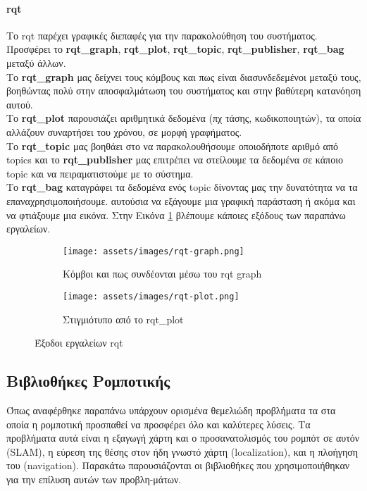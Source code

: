 \paragraph{rqt} 
Το rqt παρέχει γραφικές διεπαφές για την παρακολούθηση του συστήματος. Προσφέρει το \textbf{rqt\_graph}, \textbf{rqt\_plot}, \textbf{rqt\_topic}, \textbf{rqt\_publisher}, \textbf{rqt\_bag} μεταξύ άλλων. \\
Το \textbf{rqt\_graph} μας δείχνει τους κόμβους και πως είναι διασυνδεδεμένοι μεταξύ τους, βοηθώντας πολύ στην αποσφαλμάτωση του συστήματος και στην βαθύτερη κατανόηση αυτού. \\
Το \textbf{rqt\_plot} παρουσιάζει αριθμητικά δεδομένα (πχ τάσης, κωδικοποιητών), τα οποία αλλάζουν συναρτήσει του χρόνου, σε μορφή γραφήματος. \\
Το \textbf{rqt\_topic} μας βοηθάει στο να παρακολουθήσουμε οποιοδήποτε αριθμό από topics και το \textbf{rqt\_publisher} μας επιτρέπει να στείλουμε τα δεδομένα σε κάποιο topic και να πειραματιστούμε με το σύστημα. \\
Το \textbf{rqt\_bag} καταγράφει τα δεδομένα ενός topic δίνοντας μας την δυνατότητα να τα επαναχρησιμοποιήσουμε.	
αυτούσια να εξάγουμε μια γραφική παράσταση ή ακόμα και να φτιάξουμε μια εικόνα. Στην Εικόνα \ref{fig:rqt_outputs} βλέπουμε κάποιες εξόδους των παραπάνω εργαλείων.
	
	
\begin{figure}[!hb]
	\centering
	\begin{subfigure}{0.49\textwidth}
		\texttt{[image: assets/images/rqt-graph.png]}
		\caption{Κόμβοι και πως συνδέονται μέσω του rqt graph}
	\end{subfigure}%
	\begin{subfigure}{0.49\textwidth}
		\texttt{[image: assets/images/rqt-plot.png]}
		\caption{Στιγμιότυπο από το rqt\_plot}
	\end{subfigure}
	\caption{Έξοδοι εργαλείων rqt}
	\label{fig:rqt_outputs}
\end{figure}	
	

\subsection{Βιβλιοθήκες Ρομποτικής}

Όπως αναφέρθηκε παραπάνω υπάρχουν ορισμένα θεμελιώδη προβλήματα τα στα οποία η ρομποτική προσπαθεί να προσφέρει όλο και καλύτερες λύσεις. Τα προβλήματα αυτά είναι η εξαγωγή χάρτη και ο προσανατολισμός του ρομπότ σε αυτόν (SLAM), η εύρεση της θέσης στον ήδη γνωστό χάρτη (localization), και η πλοήγηση του (navigation). Παρακάτω παρουσιάζονται οι βιβλιοθήκες που χρησιμοποιήθηκαν για την επίλυση αυτών των προβλη-μάτων.

